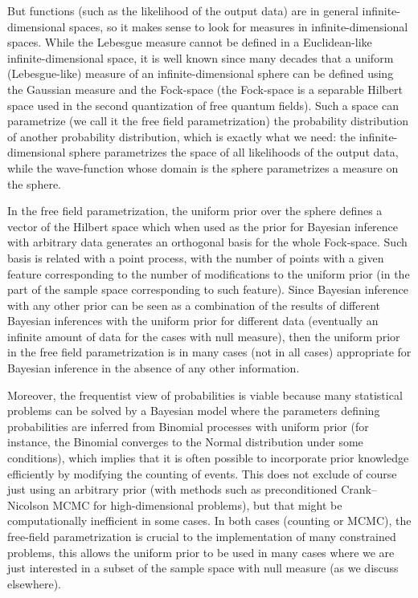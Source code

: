 \documentclass[11pt]{book}
\begin{document}
But functions (such as the likelihood of the output data) are in general
infinite-dimensional spaces, so it makes sense to look for measures in
infinite-dimensional spaces. While the Lebesgue measure cannot be
defined in a Euclidean-like infinite-dimensional
space\cite{baker1991lebesgue}\cite{baker2004lebesgue}, it is
well known since many decades that a uniform (Lebesgue-like) measure of
an infinite-dimensional sphere can be defined using the Gaussian measure
and the Fock-space (the Fock-space is a separable Hilbert space used in
the second quantization of free quantum
fields)\cite{Peterson2019GaussianLA}.
Such a space can parametrize (we call it the free field parametrization)
the probability distribution of another probability distribution, which
is exactly what we need: the infinite-dimensional sphere parametrizes
the space of all likelihoods of the output data, while the wave-function
whose domain is the sphere parametrizes a measure on the sphere.

In the free field parametrization, the uniform prior over the sphere
defines a vector of the Hilbert space which when used as the prior for
Bayesian inference with arbitrary data generates an orthogonal basis for
the whole Fock-space. Such basis is related with a point process, with
the number of points with a given feature corresponding to the number of
modifications to the uniform prior (in the part of the sample space
corresponding to such feature). Since Bayesian inference with any other
prior can be seen as a combination of the results of different Bayesian
inferences with the uniform prior for different data (eventually an
infinite amount of data for the cases with null measure), then the
uniform prior in the free field parametrization is in many cases (not in
all cases\cite{dutchbook})
appropriate for Bayesian inference in the absence of any other
information.

Moreover, the frequentist view of probabilities is viable because many
statistical problems can be solved by a Bayesian model where the
parameters defining probabilities are inferred from Binomial processes
with uniform prior (for instance, the Binomial converges to the Normal
distribution under some conditions), which implies that it is often
possible to incorporate prior knowledge efficiently by modifying the
counting of events. This does not exclude of course just using an
arbitrary prior (with methods such as preconditioned Crank--Nicolson
MCMC for high-dimensional problems), but that might be computationally
inefficient in some cases. In both cases (counting or MCMC), the
free-field parametrization is crucial to the implementation of many
constrained problems, this allows the uniform prior to be used in many
cases where we are just interested in a subset of the sample space with
null measure (as we discuss elsewhere).
\end{document}
